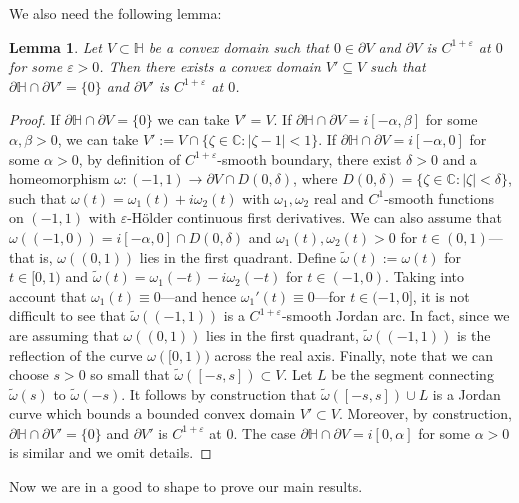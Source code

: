 \documentclass[12pt]{amsart}
\newtheorem{lemma}[theorem]{Lemma}
\theoremstyle{definition}
\theoremstyle{remark}
\numberwithin{equation}{section}
\def\C{\mathbb C}
\def\Ha{\mathbb H}
\begin{document}
{We also need the following lemma:}

\begin{lemma}\label{Lem:goodV}
{Let $V\subset \Ha$ be a  convex domain such that $0\in \partial V$ and $\partial V$ is $C^{1+\varepsilon}$ at $0$ for some $\varepsilon>0$. Then there exists a  convex domain $V'\subseteq V$ such that $\partial \Ha\cap \partial V'=\{0\}$ and $\partial V'$ is $C^{1+\varepsilon}$ at $0$.
}
\end{lemma}
\begin{proof}
If  $\partial \Ha\cap \partial V=\{0\}$ we can take $V'=V$. If $\partial \Ha\cap \partial V=i [-\alpha, \beta]$ for some $\alpha, \beta>0$, we can take $V':=V\cap \{\zeta\in \C: |\zeta-1|<1\}$. If $\partial \Ha\cap \partial V=i [-\alpha, 0]$ for some $\alpha>0$, by definition of $C^{1+\varepsilon}$-smooth boundary, there exist $\delta>0$ and a homeomorphism $\omega:(-1,1)\to \partial V\cap D(0,\delta)$, where $D(0,\delta)=\{\zeta\in \C: |\zeta|<\delta\}$, such that $\omega(t)=\omega_1(t)+i\omega_2(t)$ with $\omega_1, \omega_2$ real and $C^1$-smooth functions on $(-1,1)$ with $\varepsilon$-H\"older continuous first derivatives. We can also assume that $\omega((-1,0))=i[-\alpha,0]\cap D(0,\delta)$ and $\omega_1(t), \omega_2(t)>0$ for $t\in (0,1)$---that is, $\omega((0,1))$ lies in the first quadrant. Define $\tilde \omega(t):=\omega(t)$ for $t\in [0,1)$ and $\tilde \omega(t)=\omega_1(-t)-i\omega_2(-t)$ for $t\in (-1,0)$. Taking into account that $\omega_1(t)\equiv 0$---and hence $\omega_1'(t)\equiv 0$---for $t\in (-1,0]$, it is not difficult to see that $\tilde \omega((-1,1))$ is a $C^{1+\varepsilon}$-smooth Jordan arc. In fact, since we are assuming that $\omega((0,1))$ lies in the first quadrant, $\tilde \omega((-1,1))$ is the reflection of the curve $\omega([0,1))$ across the real axis.  Finally, note that we can choose  $s>0$  so small that $\tilde\omega([-s,s])\subset V$. Let $L$ be the segment connecting $\tilde\omega(s)$ to  $\tilde\omega(-s)$. It follows by construction that $\tilde\omega([-s,s])\cup L$ is a Jordan curve which bounds a bounded convex domain $V'\subset V$. Moreover, by construction,  $\partial \Ha\cap \partial V'=\{0\}$ and $\partial V'$ is $C^{1+\varepsilon}$ at $0$. The case $\partial \Ha\cap \partial V=i [0,\alpha]$ for some $\alpha>0$ is similar and we omit details.
\end{proof}

Now we are in a good to shape to prove our main results.
\end{document}
